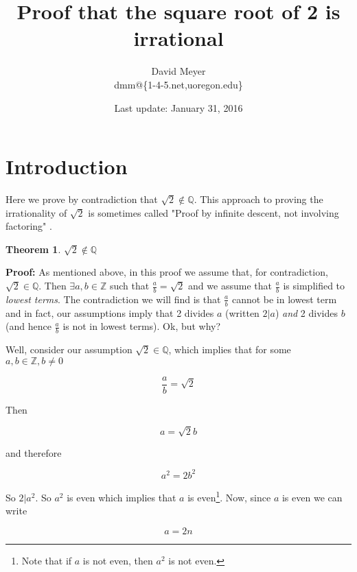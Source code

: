 \documentclass[11pt, oneside]{article}   	%
\title{Proof that the square root of 2 is irrational}
\author{David Meyer \\ dmm@\{1-4-5.net,uoregon.edu\}}
\date{Last update: January 31, 2016}							%
\theoremstyle{definition}
\newtheorem{thm}{Theorem}[section]
\begin{document}
\maketitle

\section{Introduction}
Here we prove by contradiction that $\sqrt{2} \notin \mathbb{Q}$. This approach to proving the irrationality of $\sqrt{2}$ is sometimes called
"Proof by infinite descent, not involving factoring" \cite{wiki:sqrt2}.

\begin{thm}
$\sqrt{2} \notin \mathbb{Q}$
\end{thm}

\noindent
\textbf{Proof:} As mentioned above, in this proof we assume that, for contradiction,  $\sqrt{2} \in \mathbb{Q}$. Then $\exists a,b  \in \mathbb{Z}$
such that $\frac{a}{b} = \sqrt{2}$ and  we assume that $\frac{a}{b}$ is simplified to \emph{lowest terms}. The contradiction we will find is that 
$\frac{a}{b}$ cannot be in lowest term and in fact, our assumptions imply that 2 divides $a$ (written $2|a$) \emph{and}  2 divides $b$ 
(and hence $\frac{a}{b}$ is not in lowest terms). Ok, but why?


\bigskip
\noindent
Well, consider our assumption $\sqrt{2} \in \mathbb{Q}$, which implies that for some $a,b \in \mathbb{Z}, b \neq 0$

\bigskip
\begin{equation*}
\frac{a}{b} = \sqrt{2}
\end{equation*}


\bigskip
\noindent
Then 

\begin{equation*}
a = \sqrt{2} b
\end{equation*}

\bigskip
\noindent
and therefore 

\begin{equation}
a^2 = 2b^2
\label{eqn:squared}
\end{equation}

\bigskip
\noindent
So $2|a^2$. So $a^2$ is even which implies that $a$ is even\footnote{Note that if $a$ is not even, then $a^2$ is not even.}. Now, since $a$ is even we can
write 

\begin{equation}
a = 2n
\label{eqn:a}
\end{equation}
\end{document}
